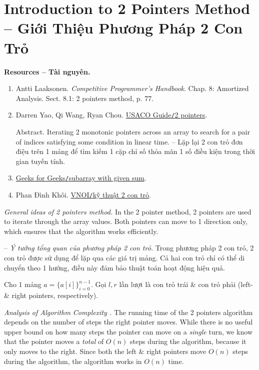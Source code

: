 \documentclass{article}
\begin{document}

\section{Introduction to 2 Pointers Method -- Giới Thiệu Phương Pháp 2 Con Trỏ}
\textbf{\textsf{Resources -- Tài nguyên.}}
\begin{enumerate}
    \item {\sc Antti Laaksonen}. {\it Competitive Programmer's Handbook}. Chap. 8: Amortized Analysis. Sect. 8.1: 2 pointers method, p. 77.

    \item {\sc Darren Yao, Qi Wang, Ryan Chou}. \href{https://usaco.guide/silver/two-pointers?lang=cpp}{USACO Guide{\tt/}2 pointers}.

    {\sf Abstract.} Iterating 2 monotonic pointers across an array to search for a pair of indices satisfying some condition in linear time. -- Lặp lại 2 con trỏ đơn điệu trên 1 mảng để tìm kiếm 1 cặp chỉ số thỏa mãn 1 số điều kiện trong thời gian tuyến tính.

    \item \href{https://www.geeksforgeeks.org/dsa/find-subarray-with-given-sum/}{Geeks for Geeks{\tt/}subarray with given sum}.

    \item {\sc Phan Đình Khôi}. \href{https://wiki.vnoi.info/algo/basic/two-pointers}{VNOI{\tt/}kỹ thuật 2 con trỏ}.
\end{enumerate}
{\it General ideas of 2 pointers method.} In the 2 pointer method, 2 pointers are used to iterate through the array values. Both pointers can move to 1 direction only, which ensures that the algorithm works efficiently.

-- {\it Ý tưởng tổng quan của phương pháp 2 con trỏ.} Trong phương pháp 2 con trỏ, 2 con trỏ được sử dụng để lặp qua các giá trị mảng. Cả hai con trỏ chỉ có thể di chuyển theo 1 hướng, điều này đảm bảo thuật toán hoạt động hiệu quả.

Cho 1 mảng $a = \{a[i]\}_{i=0}^{n-1}$. Gọi $l,r$ lần lượt là con trỏ trái \& con trỏ phải (left- \& right pointers, respectively).

{\it Analysis of Algorithm Complexity .} The running time of the 2 pointers algorithm depends on the number of steps the right pointer moves. While there is no useful upper bound on how many steps the pointer can move on a {\it single} turn, we know that the pointer moves a {\it total} of $O(n)$ steps during the algorithm, because it only moves to the right. Since both the left \& right pointers move $O(n)$ steps during the algorithm, the algorithm works in $O(n)$ time.
\end{document}
